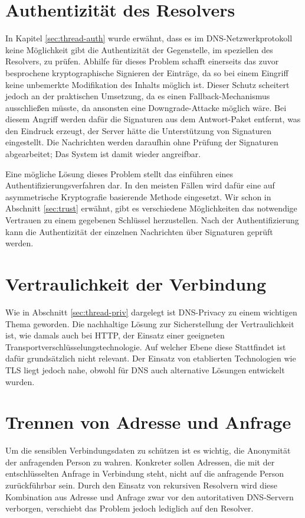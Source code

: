 \section{Authentizität des Resolvers}
In Kapitel \ref{sec:thread-auth} wurde erwähnt, dass es im DNS-Netzwerkprotokoll keine Möglichkeit gibt die Authentizität der Gegenstelle, im speziellen des Resolvers, zu prüfen. Abhilfe für dieses Problem schafft einerseits das zuvor besprochene kryptographische Signieren der Einträge, da so bei einem Eingriff keine unbemerkte Modifikation des Inhalts möglich ist. Dieser Schutz scheitert jedoch an der praktischen Umsetzung, da es einen Fallback-Mechanismus ausschließen müsste, da ansonsten eine Downgrade-Attacke möglich wäre\cite{Bau2010}. Bei diesem Angriff werden dafür die Signaturen aus dem Antwort-Paket entfernt, was den Eindruck erzeugt, der Server hätte die Unterstützung von Signaturen eingestellt. Die Nachrichten werden daraufhin ohne Prüfung der Signaturen abgearbeitet; Das System ist damit wieder angreifbar. 

Eine mögliche Lösung dieses Problem stellt das einführen eines Authentifizierungsverfahren dar. In den meisten Fällen wird dafür eine auf asymmetrische Kryptografie basierende Methode eingesetzt. Wir schon in Abschnitt \ref{sec:trust} erwähnt, gibt es verschiedene Möglichkeiten das notwendige Vertrauen zu einem gegebenen Schlüssel herzustellen. Nach der Authentifizierung kann die Authentizität der einzelnen Nachrichten über Signaturen geprüft werden.

\section{Vertraulichkeit der Verbindung}
Wie in Abschnitt \ref{sec:thread-priv} dargelegt ist DNS-Privacy zu einem wichtigen Thema geworden. Die nachhaltige Lösung zur Sicherstellung der Vertraulichkeit ist, wie damals auch bei HTTP, der Einsatz einer geeigneten Transportverschlüsselungstechnologie. Auf welcher Ebene diese Stattfindet ist dafür grundsätzlich nicht relevant. Der Einsatz von etablierten Technologien wie TLS liegt jedoch nahe, obwohl für DNS auch alternative Lösungen entwickelt wurden. 

\section{Trennen von Adresse und Anfrage}
\label{sec:goals-sourceanon}
Um die sensiblen Verbindungsdaten zu schützen ist es wichtig, die Anonymität der anfragenden Person zu wahren. Konkreter sollen Adressen, die mit der entschlüsselten Anfrage in Verbindung steht, nicht auf die anfragende Person zurückführbar sein. Durch den Einsatz von rekursiven Resolvern wird diese Kombination aus Adresse und Anfrage zwar vor den autoritativen DNS-Servern verborgen, verschiebt das Problem jedoch lediglich auf den Resolver. 

